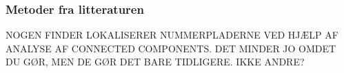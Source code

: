 \subsubsection{Metoder fra litteraturen}

NOGEN FINDER LOKALISERER NUMMERPLADERNE VED HJÆLP AF ANALYSE AF CONNECTED COMPONENTS. DET MINDER JO OMDET DU GØR, MEN DE GØR DET BARE TIDLIGERE.
IKKE ANDRE?

